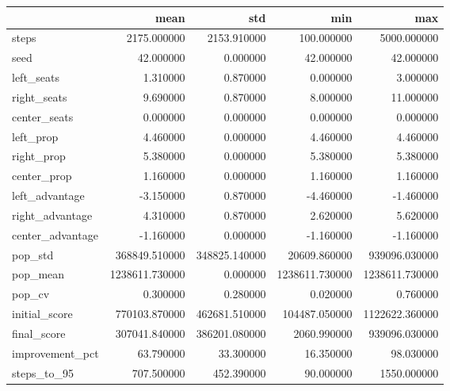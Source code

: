 \begin{tabular}{lrrrr}
\toprule
 & mean & std & min & max \\
\midrule
steps & 2175.000000 & 2153.910000 & 100.000000 & 5000.000000 \\
seed & 42.000000 & 0.000000 & 42.000000 & 42.000000 \\
left_seats & 1.310000 & 0.870000 & 0.000000 & 3.000000 \\
right_seats & 9.690000 & 0.870000 & 8.000000 & 11.000000 \\
center_seats & 0.000000 & 0.000000 & 0.000000 & 0.000000 \\
left_prop & 4.460000 & 0.000000 & 4.460000 & 4.460000 \\
right_prop & 5.380000 & 0.000000 & 5.380000 & 5.380000 \\
center_prop & 1.160000 & 0.000000 & 1.160000 & 1.160000 \\
left_advantage & -3.150000 & 0.870000 & -4.460000 & -1.460000 \\
right_advantage & 4.310000 & 0.870000 & 2.620000 & 5.620000 \\
center_advantage & -1.160000 & 0.000000 & -1.160000 & -1.160000 \\
pop_std & 368849.510000 & 348825.140000 & 20609.860000 & 939096.030000 \\
pop_mean & 1238611.730000 & 0.000000 & 1238611.730000 & 1238611.730000 \\
pop_cv & 0.300000 & 0.280000 & 0.020000 & 0.760000 \\
initial_score & 770103.870000 & 462681.510000 & 104487.050000 & 1122622.360000 \\
final_score & 307041.840000 & 386201.080000 & 2060.990000 & 939096.030000 \\
improvement_pct & 63.790000 & 33.300000 & 16.350000 & 98.030000 \\
steps_to_95 & 707.500000 & 452.390000 & 90.000000 & 1550.000000 \\
\bottomrule
\end{tabular}
